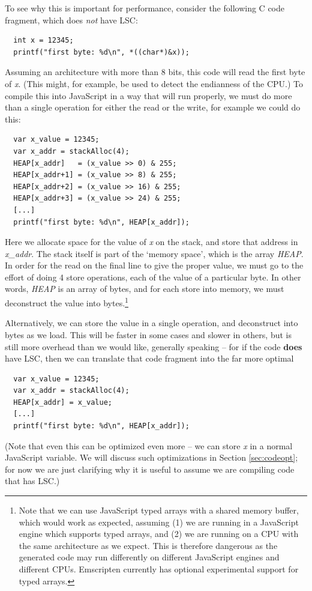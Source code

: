 \documentclass[preprint,10pt]{sigplanconf}
\begin{document}
To see why this is important for performance, consider the following
C code fragment, which does \emph{not} have LSC:
\begin{verbatim}
  int x = 12345;
  printf("first byte: %d\n", *((char*)&x));
\end{verbatim}
Assuming an architecture with more than 8 bits, this code will read
the first byte of \emph{x}. (This might, for example, be used to detect the
endianness of the CPU.) To compile this into JavaScript in
a way that will run properly, we must do more than a single operation
for either the read or the write, for example we could do this:
\begin{verbatim}
  var x_value = 12345;
  var x_addr = stackAlloc(4);
  HEAP[x_addr]   = (x_value >> 0) & 255;
  HEAP[x_addr+1] = (x_value >> 8) & 255;
  HEAP[x_addr+2] = (x_value >> 16) & 255;
  HEAP[x_addr+3] = (x_value >> 24) & 255;
  [...]
  printf("first byte: %d\n", HEAP[x_addr]);
\end{verbatim}
Here we allocate space for the value of \emph{x} on the stack, and
store that address in \emph{x\_addr}. The stack itself is part of
the `memory space', which is the array \emph{HEAP}. In order for
the read on the final line to give the proper value, we must go to
the effort of doing 4 store operations, each of the value of a
particular byte. In other words, \emph{HEAP} is an array of bytes,
and for each store into memory, we must deconstruct the value into
bytes.\footnote{Note that we can use JavaScript typed arrays with a shared memory
buffer, which would work as expected, assuming (1) we are running
in a JavaScript engine which supports typed arrays, and (2) we
are running on a CPU with the same architecture as we expect. This
is therefore dangerous as the generated code may run differently on
different JavaScript engines and different CPUs.
Emscripten currently has optional experimental support for typed arrays.}

Alternatively, we can store the value in a single operation, and
deconstruct into bytes as we load. This will be faster in some
cases and slower in others, but is still more overhead
than we would like, generally speaking -- for if the code \textbf{does} have
LSC, then we can translate that code fragment into
the far more optimal
\begin{verbatim}
  var x_value = 12345;
  var x_addr = stackAlloc(4);
  HEAP[x_addr] = x_value;
  [...]
  printf("first byte: %d\n", HEAP[x_addr]);
\end{verbatim}
(Note that even this can be optimized even more -- we can store
\emph{x} in a normal JavaScript variable. We will discuss such
optimizations in Section \ref{sec:codeopt}; for now we are
just clarifying why it is useful to assume we are compiling code
that has LSC.)
\end{document}

